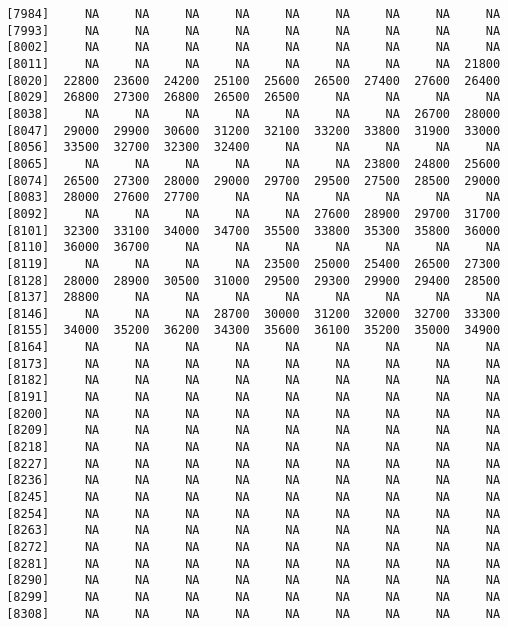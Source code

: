 \documentclass[]{article}
\begin{document}
\begin{verbatim}
 [7984]     NA     NA     NA     NA     NA     NA     NA     NA     NA
 [7993]     NA     NA     NA     NA     NA     NA     NA     NA     NA
 [8002]     NA     NA     NA     NA     NA     NA     NA     NA     NA
 [8011]     NA     NA     NA     NA     NA     NA     NA     NA  21800
 [8020]  22800  23600  24200  25100  25600  26500  27400  27600  26400
 [8029]  26800  27300  26800  26500  26500     NA     NA     NA     NA
 [8038]     NA     NA     NA     NA     NA     NA     NA  26700  28000
 [8047]  29000  29900  30600  31200  32100  33200  33800  31900  33000
 [8056]  33500  32700  32300  32400     NA     NA     NA     NA     NA
 [8065]     NA     NA     NA     NA     NA     NA  23800  24800  25600
 [8074]  26500  27300  28000  29000  29700  29500  27500  28500  29000
 [8083]  28000  27600  27700     NA     NA     NA     NA     NA     NA
 [8092]     NA     NA     NA     NA     NA  27600  28900  29700  31700
 [8101]  32300  33100  34000  34700  35500  33800  35300  35800  36000
 [8110]  36000  36700     NA     NA     NA     NA     NA     NA     NA
 [8119]     NA     NA     NA     NA  23500  25000  25400  26500  27300
 [8128]  28000  28900  30500  31000  29500  29300  29900  29400  28500
 [8137]  28800     NA     NA     NA     NA     NA     NA     NA     NA
 [8146]     NA     NA     NA  28700  30000  31200  32000  32700  33300
 [8155]  34000  35200  36200  34300  35600  36100  35200  35000  34900
 [8164]     NA     NA     NA     NA     NA     NA     NA     NA     NA
 [8173]     NA     NA     NA     NA     NA     NA     NA     NA     NA
 [8182]     NA     NA     NA     NA     NA     NA     NA     NA     NA
 [8191]     NA     NA     NA     NA     NA     NA     NA     NA     NA
 [8200]     NA     NA     NA     NA     NA     NA     NA     NA     NA
 [8209]     NA     NA     NA     NA     NA     NA     NA     NA     NA
 [8218]     NA     NA     NA     NA     NA     NA     NA     NA     NA
 [8227]     NA     NA     NA     NA     NA     NA     NA     NA     NA
 [8236]     NA     NA     NA     NA     NA     NA     NA     NA     NA
 [8245]     NA     NA     NA     NA     NA     NA     NA     NA     NA
 [8254]     NA     NA     NA     NA     NA     NA     NA     NA     NA
 [8263]     NA     NA     NA     NA     NA     NA     NA     NA     NA
 [8272]     NA     NA     NA     NA     NA     NA     NA     NA     NA
 [8281]     NA     NA     NA     NA     NA     NA     NA     NA     NA
 [8290]     NA     NA     NA     NA     NA     NA     NA     NA     NA
 [8299]     NA     NA     NA     NA     NA     NA     NA     NA     NA
 [8308]     NA     NA     NA     NA     NA     NA     NA     NA     NA

\end{verbatim}
\end{document}
